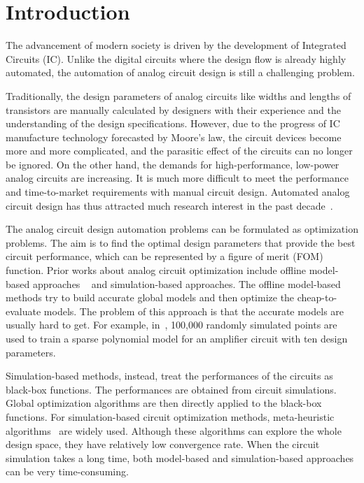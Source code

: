\section{Introduction}

%
The advancement of modern society is driven by the development of Integrated
Circuits (IC). Unlike the digital circuits where the design flow is already
highly automated, the automation of analog circuit design is still a
challenging problem.

Traditionally, the design parameters of analog circuits like widths and lengths of
transistors are manually calculated by designers with their experience and the
understanding of the design specifications. However, due to the progress of IC
manufacture technology forecasted by Moore's law, the circuit devices become
more and more complicated, and the parasitic effect of the circuits can no
longer be ignored. On the other hand, the demands for high-performance,
low-power analog circuits are increasing. It is much more difficult to
meet the performance and time-to-market requirements with manual circuit design.
Automated analog circuit design has thus attracted much research interest in
the past decade~\cite{rutenbar2007hierarchical}.

The analog circuit design automation problems can be formulated as optimization
problems. The aim is to find the optimal design parameters that provide
the best circuit performance, which can be represented by a figure of merit (FOM)
function. Prior works about analog circuit optimization include offline
model-based approaches
~\cite{colleran2003optimization,daems2003simulation,wang2014enabling} and
simulation-based approaches. The offline model-based methods try to build
accurate global models and then optimize the cheap-to-evaluate models. The
problem of this approach is that the accurate models are usually hard to get.
For example, in~\cite{wang2014enabling}, 100,000 randomly simulated points are
used to train a sparse polynomial model for an amplifier circuit with ten
design parameters.

Simulation-based methods, instead, treat the performances of the circuits as black-box functions. The performances are obtained from circuit simulations. Global optimization
algorithms are then directly applied to the black-box functions. For
simulation-based circuit optimization methods, meta-heuristic
algorithms~\cite{phelps2000anaconda, liu2009analog} are widely used. Although
these algorithms can explore the whole design space, they have relatively low
convergence rate. When the circuit simulation takes a long time, both
model-based and simulation-based approaches can be very time-consuming.

